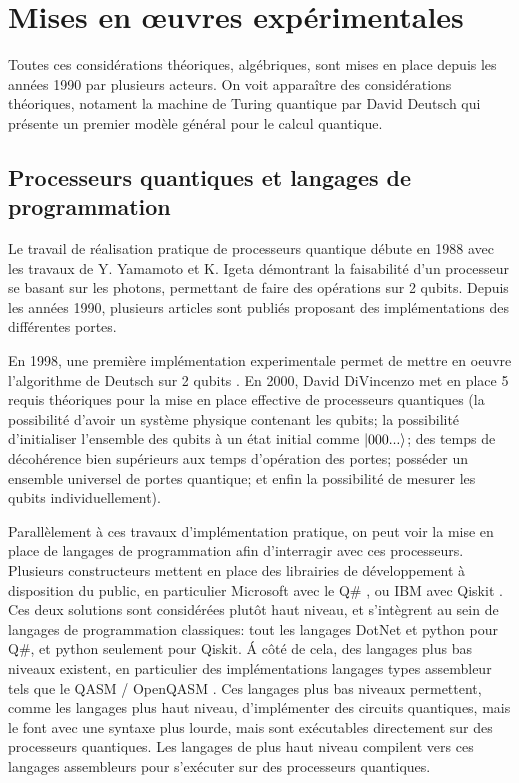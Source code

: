 \chapter{Mises en \oe{}uvres expérimentales}

Toutes ces considérations théoriques, algébriques, sont mises en place depuis les années 1990 par plusieurs acteurs. On voit apparaître des considérations théoriques, notament la machine de Turing quantique par David Deutsch \cite{Deutsch85} qui présente un premier modèle général pour le calcul quantique. 

\section{Processeurs quantiques et langages de programmation}
Le travail de réalisation pratique de processeurs quantique débute en 1988 avec les travaux de Y. Yamamoto et K. Igeta \cite{Igeta:88} démontrant la faisabilité d'un processeur se basant sur les photons, permettant de faire des opérations sur 2 qubits. Depuis les années 1990, plusieurs articles sont publiés proposant des implémentations des différentes portes. 

En 1998, une première implémentation experimentale permet de mettre en oeuvre l'algorithme de Deutsch sur 2 qubits \cite{Chuang1998ExperimentalIO}. En 2000, David DiVincenzo met en place 5 requis théoriques pour la mise en place effective de processeurs quantiques \cite{DiVincenzo_2000} (la possibilité d'avoir un système physique contenant les qubits; la possibilité d'initialiser l'ensemble des qubits à un état initial comme $\ket{000...}$; des temps de décohérence bien supérieurs aux temps d'opération des portes; posséder un ensemble universel de portes quantique; et enfin la possibilité de mesurer les qubits individuellement).

Parallèlement à ces travaux d'implémentation pratique, on peut voir la mise en place de langages de programmation afin d'interragir avec ces processeurs. Plusieurs constructeurs mettent en place des librairies de développement à disposition du public, en particulier Microsoft avec le Q\# \cite{MicrosoftQuantumDoc}, ou IBM avec Qiskit \cite{Qiskit}. Ces deux solutions sont considérées plutôt haut niveau, et s'intègrent au sein de langages de programmation classiques: tout les langages DotNet et python pour Q\#, et python seulement pour Qiskit. \'A côté de cela, des langages plus bas niveaux existent, en particulier des implémentations langages types assembleur tels que le QASM / OpenQASM \cite{cross2017open}. Ces langages plus bas niveaux permettent, comme les langages plus haut niveau, d'implémenter des circuits quantiques, mais le font avec une syntaxe plus lourde, mais sont exécutables directement sur des processeurs quantiques. Les langages de plus haut niveau compilent vers ces langages assembleurs pour s'exécuter sur des processeurs quantiques.

